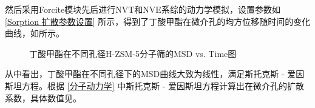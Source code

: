 \par{然后采用Forcite模块先后进行NVT和NVE系综的动力学模拟，设置参数如 \ref{Sorption 扩散参数设置} 所示，得到了丁酸甲酯在微介孔的均方位移随时间的变化曲线，如所示。}
\begin{figure}[H]
    \centering

    \caption{丁酸甲酯在不同孔径H-ZSM-5分子筛的MSD vs. Time图}
    \label{fig:MSDd}
\end{figure}
\par{从中看出，丁酸甲酯在不同孔径下的MSD曲线大致为线性，满足斯托克斯 - 爱因斯坦方程。根据 \ref{分子动力学} 中斯托克斯 - 爱因斯坦方程计算出在微介孔的扩散系数，具体数值见。}

